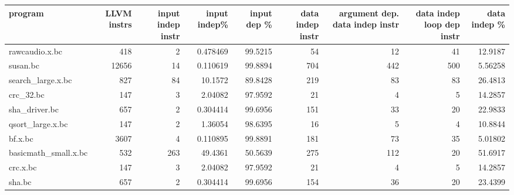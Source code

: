 \begin{tabular}{lrrrrrrrr}
\hline
 program              &   LLVM instrs &   input indep instr &   input indep\% &   input dep \% &   data indep instr &   argument dep. data indep instr &   data indep loop dep instr &   data indep \% \\
\hline
 rawcaudio.x.bc       &           418 &                   2 &      0.478469  &       99.5215 &                 54 &                               12 &                          41 &       12.9187  \\
 susan.bc             &         12656 &                  14 &      0.110619  &       99.8894 &                704 &                              442 &                         500 &        5.56258 \\
 search\_large.x.bc    &           827 &                  84 &     10.1572    &       89.8428 &                219 &                               83 &                          83 &       26.4813  \\
 crc\_32.bc            &           147 &                   3 &      2.04082   &       97.9592 &                 21 &                                4 &                           5 &       14.2857  \\
 sha\_driver.bc        &           657 &                   2 &      0.304414  &       99.6956 &                151 &                               33 &                          20 &       22.9833  \\
 qsort\_large.x.bc     &           147 &                   2 &      1.36054   &       98.6395 &                 16 &                                5 &                           4 &       10.8844  \\
 bf.x.bc              &          3607 &                   4 &      0.110895  &       99.8891 &                181 &                               73 &                          35 &        5.01802 \\
 basicmath\_small.x.bc &           532 &                 263 &     49.4361    &       50.5639 &                275 &                              112 &                          20 &       51.6917  \\
 crc.x.bc             &           147 &                   3 &      2.04082   &       97.9592 &                 21 &                                4 &                           5 &       14.2857  \\
 sha.bc               &           657 &                   2 &      0.304414  &       99.6956 &                154 &                               36 &                          20 &       23.4399  \\

\end{tabular}
